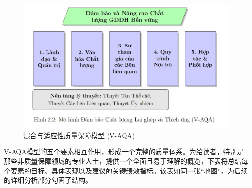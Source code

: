 \begin{figure}[h!]
    \centering
    \includegraphics[width=\textwidth]{image/mo_hinh_V-AQA.jpg}
    \caption{混合与适应性质量保障模型 (V-AQA)}
    \label{fig:v-aqa-model-detailed}
\end{figure}

V-AQA模型的五个要素相互作用，形成一个完整的质量体系。为给读者，特别是那些非质量保障领域的专业人士，提供一个全面且易于理解的概览，下表将总结每个要素的目标、具体表现以及建议的关键绩效指标。该表如同一张“地图”，为后续的详细分析部分勾画了结构。

